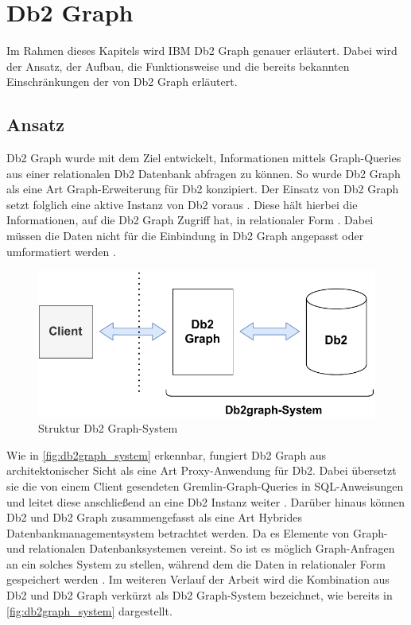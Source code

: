 \section{Db2 Graph}
\label{chap:db2graph}

Im Rahmen dieses Kapitels wird IBM Db2 Graph genauer erläutert. Dabei wird der Ansatz, der Aufbau, die Funktionsweise und die bereits bekannten Einschränkungen der von Db2 Graph erläutert. 

\subsection{Ansatz}
\label{db2graph:ansatz}
Db2 Graph wurde mit dem Ziel entwickelt, Informationen mittels Graph-Queries aus einer relationalen Db2 Datenbank abfragen zu können. So wurde Db2 Graph als eine Art Graph-Erweiterung für Db2 konzipiert. Der Einsatz von Db2 Graph setzt folglich eine aktive Instanz von Db2 voraus \cite{vldb_tian, sigmod_tian}. Diese hält hierbei die Informationen, auf die Db2 Graph Zugriff hat, in relationaler Form \cite{vldb_tian, sigmod_tian}. Dabei müssen die Daten nicht für die Einbindung in Db2 Graph angepasst oder umformatiert werden \cite{vldb_tian, sigmod_tian}.

\begin{figure}[h]
    \centering
    \includegraphics[width=\textwidth]{images/db2graph_system.pdf}
    \vspace{0.1em}
    \caption{Struktur Db2 Graph-System}
    \label{fig:db2graph_system}
\end{figure}

Wie in \autoref{fig:db2graph_system} erkennbar, fungiert Db2 Graph aus architektonischer Sicht als eine Art Proxy-Anwendung für Db2. Dabei übersetzt sie die von einem Client gesendeten Gremlin-Graph-Queries in SQL-An\-wei\-sung\-en und leitet diese anschließend an eine Db2 Instanz weiter \cite{vldb_tian, sigmod_tian}. Darüber hinaus können Db2 und Db2 Graph zusammengefasst als eine Art Hybrides Datenbankmanagementsystem betrachtet werden. Da es Elemente von Graph- und relationalen Datenbanksystemen vereint. So ist es möglich Graph-Anfragen an ein solches System zu stellen, während dem die Daten in relationaler Form gespeichert werden \cite{vldb_tian, sigmod_tian}. Im weiteren Verlauf der Arbeit wird die Kombination aus Db2 und Db2 Graph verkürzt als Db2 Graph-System bezeichnet, wie bereits in \autoref{fig:db2graph_system} dargestellt. 

